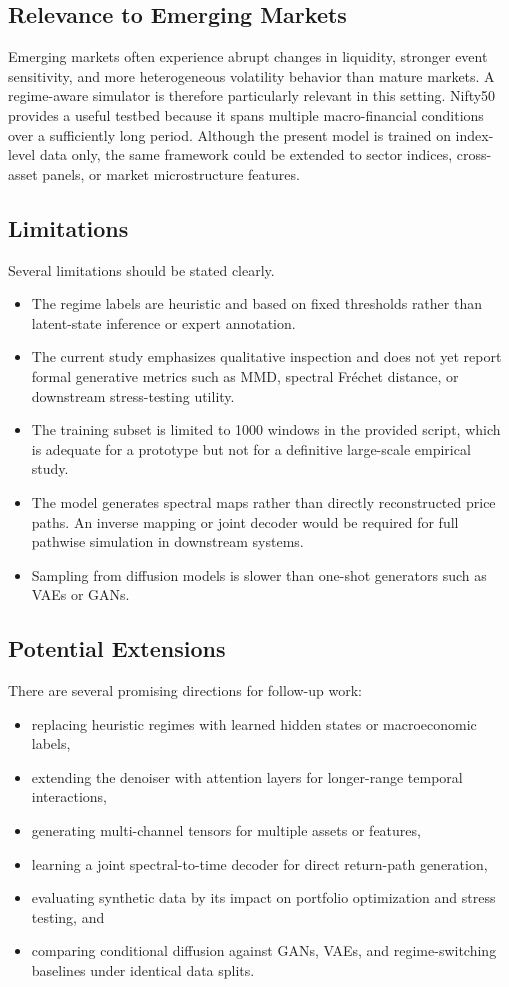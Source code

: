 \documentclass[conference]{IEEEtran}
\begin{document}
\subsection{Relevance to Emerging Markets}
Emerging markets often experience abrupt changes in liquidity, stronger event sensitivity, and more heterogeneous volatility behavior than mature markets. A regime-aware simulator is therefore particularly relevant in this setting. Nifty50 provides a useful testbed because it spans multiple macro-financial conditions over a sufficiently long period. Although the present model is trained on index-level data only, the same framework could be extended to sector indices, cross-asset panels, or market microstructure features.

\subsection{Limitations}
Several limitations should be stated clearly.
\begin{itemize}
    \item The regime labels are heuristic and based on fixed thresholds rather than latent-state inference or expert annotation.
    \item The current study emphasizes qualitative inspection and does not yet report formal generative metrics such as MMD, spectral Fr\'echet distance, or downstream stress-testing utility.
    \item The training subset is limited to 1000 windows in the provided script, which is adequate for a prototype but not for a definitive large-scale empirical study.
    \item The model generates spectral maps rather than directly reconstructed price paths. An inverse mapping or joint decoder would be required for full pathwise simulation in downstream systems.
    \item Sampling from diffusion models is slower than one-shot generators such as VAEs or GANs.
\end{itemize}

\subsection{Potential Extensions}
There are several promising directions for follow-up work:
\begin{itemize}
    \item replacing heuristic regimes with learned hidden states or macroeconomic labels,
    \item extending the denoiser with attention layers for longer-range temporal interactions,
    \item generating multi-channel tensors for multiple assets or features,
    \item learning a joint spectral-to-time decoder for direct return-path generation,
    \item evaluating synthetic data by its impact on portfolio optimization and stress testing, and
    \item comparing conditional diffusion against GANs, VAEs, and regime-switching baselines under identical data splits.
\end{itemize}
\end{document}
